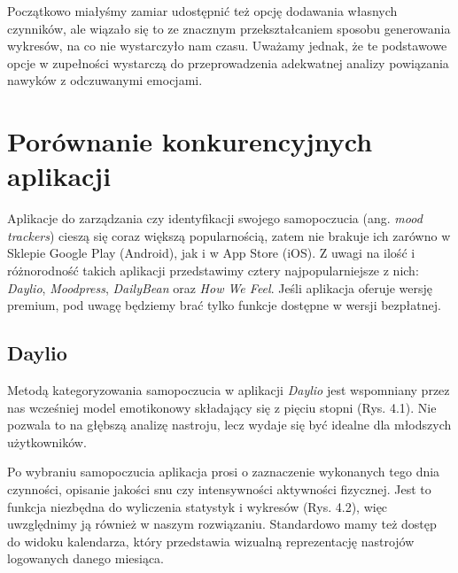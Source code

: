 \documentclass[inz, shortabstract]{iithesis}
\begin{document}
Początkowo miałyśmy zamiar udostępnić też opcję dodawania własnych czynników, ale wiązało się to ze znacznym przekształcaniem sposobu generowania wykresów, na co nie wystarczyło nam czasu. Uważamy jednak, że te podstawowe opcje w zupełności wystarczą do przeprowadzenia adekwatnej analizy powiązania nawyków z odczuwanymi emocjami.

\chapter{Porównanie konkurencyjnych aplikacji}
Aplikacje do zarządzania czy identyfikacji swojego samopoczucia (ang. \textit{mood trackers}) cieszą się coraz większą popularnością, zatem nie brakuje ich zarówno w Sklepie Google Play (Android), jak i w App Store (iOS). Z uwagi na ilość i różnorodność takich aplikacji przedstawimy cztery najpopularniejsze z nich: \textit{Daylio}, \textit{Moodpress}, \textit{DailyBean} oraz \textit{How We Feel}. Jeśli aplikacja oferuje wersję premium, pod uwagę będziemy brać tylko funkcje dostępne w wersji bezpłatnej.
\section{Daylio}
Metodą kategoryzowania samopoczucia w aplikacji \textit{Daylio} jest wspomniany przez nas wcześniej model emotikonowy składający się z pięciu stopni (Rys. 4.1). Nie pozwala to na głębszą analizę nastroju, lecz wydaje się być idealne dla młodszych użytkowników. 

Po wybraniu samopoczucia aplikacja prosi o zaznaczenie wykonanych tego dnia czynności, opisanie jakości snu czy intensywności aktywności fizycznej. Jest to funkcja niezbędna do wyliczenia statystyk i wykresów (Rys. 4.2), więc uwzględnimy ją również w naszym rozwiązaniu. Standardowo mamy też dostęp do widoku kalendarza, który przedstawia wizualną reprezentację nastrojów logowanych danego miesiąca.
\end{document}
